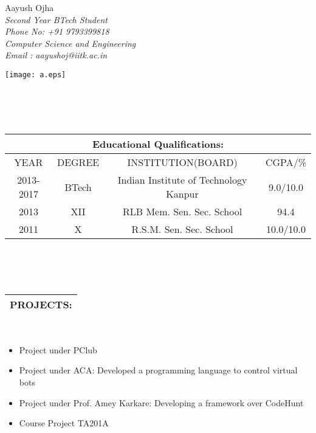 \documentclass[11pt]{article}
\begin{document}
	\begin{minipage}{0.5\textwidth}
\huge{Aayush Ojha}\\
\normalsize
\emph{Second Year BTech Student} \hfill \\ \emph{Phone No: +91 9793399818}\\
\emph{Computer Science and Engineering} \hfill  \\ \emph{Email : aayushoj@iitk.ac.in}\\
	\end{minipage}
	\begin{minipage}{0.5\textwidth}
\begin{center}
	\texttt{[image: a.eps]}\\
\end{center}
	\end{minipage}
	\\
	\\
	\\
\begin{tabular}{|c|c|c|c|}
\hline
\multicolumn{4}{|c|}{Educational Qualifications:}\\[5pt]
\hline
YEAR & DEGREE & INSTITUTION(BOARD) & CGPA/\%\\
\hline
2013-2017 & BTech & Indian Institute of Technology Kanpur & 9.0/10.0\\
\hline
2013 & XII & RLB Mem. Sen. Sec. School & 94.4\\
\hline
2011 & X & R.S.M. Sen. Sec. School & 10.0/10.0\\
\hline
\end{tabular}
\\
\\
\\
\begin{tabular}{ccccccc}
	\multicolumn{7}{c}{PROJECTS:}\\[5pt]
\hline
\end{tabular}
\\
\begin{itemize}
	\item Project under PClub\\
	\item Project under ACA: Developed a programming language to control virtual bots\\
	\item Project under Prof. Amey Karkare: Developing a framework over CodeHunt\\
	\item Course Project TA201A\\
\end{itemize}
\end{document}
